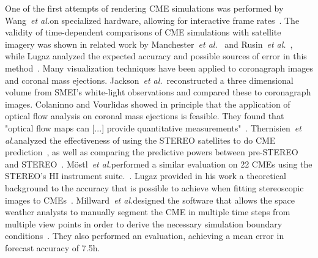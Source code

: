 \documentclass[journal]{vgtc}                %
\def\etal{\textit{et al.}}
\def\etal{\textit{et al.}}
\begin{document}
 One of the first attempts of rendering CME simulations was performed by Wang~\etal on specialized hardware, allowing for interactive frame rates~\cite{wang2004visualization}. The validity of time-dependent comparisons of CME simulations with satellite imagery was shown in related work by Manchester~\etal ~\cite{manchester2008three} and Rusin~\etal ~\cite{rusin2010comparing}, while Lugaz analyzed the expected accuracy and possible sources of error in this method~\cite{lugaz2010accuracy}.  Many visualization techniques have been applied to coronagraph images and coronal mass ejections. Jackson~\etal\ reconstructed a three dimensional volume from SMEI's white-light observations and compared these to coronagraph images. Colaninno and Vourlidas showed in principle that the application of optical flow analysis on coronal mass ejections is feasible. They found that "optical flow maps can [...] provide quantitative measurements"~\cite{Colaninno:2006ef}. Thernisien~\etal analyzed the effectiveness of using the STEREO satellites to do CME prediction~\cite{Thernisien:2009hx}, as well as comparing the predictive powers between pre-STEREO and STEREO~\cite{Thernisien:2011fl}. M\"ostl~\etal performed a similar evaluation on 22 CMEs using the STEREO's HI instrument suite.~\cite{Mostl:2014iv}. Lugaz provided in his work a theoretical background to the accuracy that is possible to achieve when fitting stereoscopic images to CMEs~\cite{Lugaz:2010dx}. Millward~\etal designed the software that allows the space weather analysts to manually segment the CME in multiple time steps from multiple view points in order to derive the necessary simulation boundary conditions~\cite{Millward:2013cm}. They also performed an evaluation, achieving a mean error in forecast accuracy of 7.5h.



\end{document}
